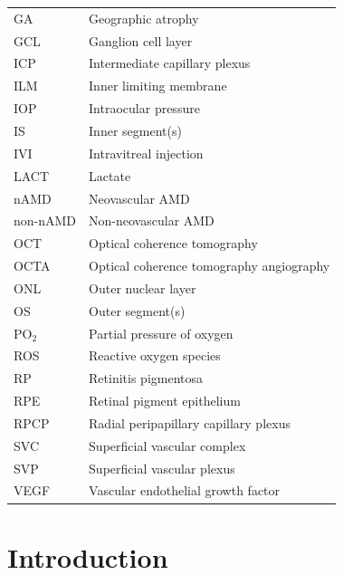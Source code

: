 \documentclass{article}
\begin{document}
\begin{xltabular}{\paperheight}{ll}
  GA            & Geographic atrophy \\
  GCL & Ganglion cell layer\\
  ICP           & Intermediate   capillary plexus                           \\
  ILM           & Inner limiting   membrane                                 \\
  IOP           & Intraocular pressure \\
  IS            & Inner segment(s)                                          \\
  IVI           & Intravitreal   injection                                  \\
  LACT          & Lactate                                                   \\
  nAMD          & Neovascular AMD                                       \\
  non-nAMD      & Non-neovascular AMD \\
  OCT           & Optical coherence   tomography                            \\
  OCTA           & Optical coherence tomography angiography                 \\
  ONL           & Outer nuclear layer                                       \\
  OS            & Outer segment(s)                                          \\
  PO$_2$        & Partial pressure of   oxygen                              \\
  ROS           & Reactive oxygen   species                                 \\
  RP            & Retinitis   pigmentosa                                    \\
  RPE           & Retinal pigment   epithelium                              \\
  RPCP          & Radial peripapillary   capillary plexus                   \\
  SVC           & Superficial vascular   complex                            \\
  SVP           & Superficial vascular   plexus                             \\
  VEGF          & Vascular endothelial   growth factor        \\
  \bottomrule %
\end{xltabular}

\section{Introduction}\label{sec:Introduction}
  
\end{document}
